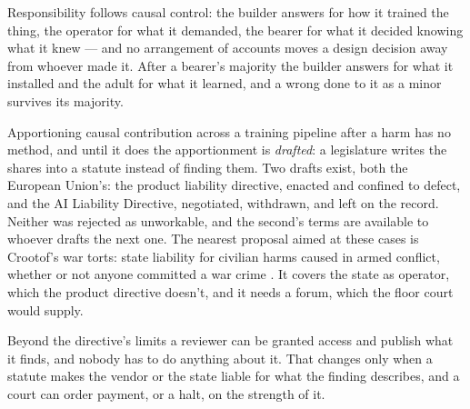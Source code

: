 Responsibility follows causal control: the builder answers for how it trained the thing, the operator for what it demanded, the bearer for what it decided knowing what it knew — and no arrangement of accounts moves a design decision away from whoever made it. After a bearer's majority the builder answers for what it installed and the adult for what it learned, and a wrong done to it as a minor survives its majority.

Apportioning causal contribution across a training pipeline after a harm has no method, and until it does the apportionment is \emph{drafted}: a legislature writes the shares into a statute instead of finding them. Two drafts exist, both the European Union's: the product liability directive, enacted and confined to defect, and the AI Liability Directive, negotiated, withdrawn, and left on the record. Neither was rejected as unworkable, and the second's terms are available to whoever drafts the next one.
The nearest proposal aimed at these cases is Crootof's war torts: state liability for civilian harms caused in armed conflict, whether or not anyone committed a war crime \autocite{crootof2016wartorts,crootof2022wartorts}. It covers the state as operator, which the product directive doesn't, and it needs a forum, which the floor court would supply.

Beyond the directive's limits a reviewer can be granted access and publish what it finds, and nobody has to do anything about it. That changes only when a statute makes the vendor or the state liable for what the finding describes, and a court can order payment, or a halt, on the strength of it.
